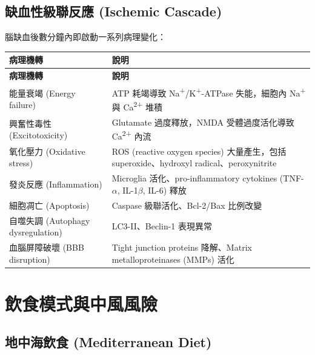 \documentclass[12pt,a4paper]{article}
\begin{document}
\subsection{缺血性級聯反應 (Ischemic Cascade)}

腦缺血後數分鐘內即啟動一系列病理變化：

\begin{longtable}{p{4cm}p{10cm}}
\toprule
\textbf{病理機轉} & \textbf{說明} \\
\midrule
\endfirsthead
\toprule
\textbf{病理機轉} & \textbf{說明} \\
\midrule
\endhead
\bottomrule
\endfoot

能量衰竭 (Energy failure) & ATP 耗竭導致 Na\textsuperscript{+}/K\textsuperscript{+}-ATPase 失能，細胞內 Na\textsuperscript{+} 與 Ca\textsuperscript{2+} 堆積 \\
\midrule
興奮性毒性 (Excitotoxicity) & Glutamate 過度釋放，NMDA 受體過度活化導致 Ca\textsuperscript{2+} 內流 \\
\midrule
氧化壓力 (Oxidative stress) & ROS (reactive oxygen species) 大量產生，包括 superoxide、hydroxyl radical、peroxynitrite \\
\midrule
發炎反應 (Inflammation) & Microglia 活化、pro-inflammatory cytokines (TNF-$\alpha$, IL-1$\beta$, IL-6) 釋放 \\
\midrule
細胞凋亡 (Apoptosis) & Caspase 級聯活化、Bcl-2/Bax 比例改變 \\
\midrule
自噬失調 (Autophagy dysregulation) & LC3-II、Beclin-1 表現異常 \\
\midrule
血腦屏障破壞 (BBB disruption) & Tight junction proteins 降解、Matrix metalloproteinases (MMPs) 活化 \\
\bottomrule
\end{longtable}


\section{飲食模式與中風風險}

\subsection{地中海飲食 (Mediterranean Diet)}
\end{document}
